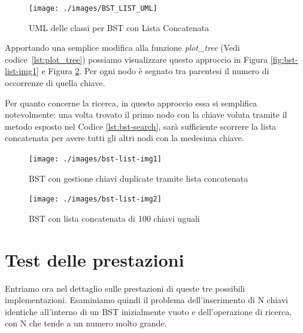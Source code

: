 \documentclass{article}
\begin{document}
\vspace{15px}


\begin{figure}[H]
  \centering
  \texttt{[image: ./images/BST\_LIST\_UML]}
    \caption{UML delle classi per BST con Lista Concatenata}
  \label{fig:BST_LIST_UML}
\end{figure}

\vspace{15px}

Apportando una semplice modifica alla funzione \textit{plot\_tree} (Vedi codice~\ref{lst:plot_tree}) possiamo visualizzare questo approccio in Figura \ref{fig:bst-list-img1} e Figura \ref{fig:bst-list-img2}.
Per ogni nodo è segnato tra parentesi il numero di occorrenze di quella chiave.

Per quanto concerne la ricerca, in questo approccio essa si semplifica notevolmente:
una volta trovato il primo nodo con la chiave voluta tramite il metodo esposto nel Codice \ref{lst:bst-search}, sarà sufficiente scorrere la lista concatenata per avere tutti gli altri nodi con la medesima chiave.


\begin{figure}[htbp]
    \centering
  \begin{minipage}{0.48\textwidth}  %
    \centering
    \texttt{[image: ./images/bst-list-img1]}
    \caption{BST con gestione chiavi duplicate tramite lista concatenata}
    \label{fig:bst-list-img1}
  \end{minipage}%
  \hfill  %
  \begin{minipage}{0.48\textwidth}  %
    \centering
    \texttt{[image: ./images/bst-list-img2]}
    \caption{BST con lista concatenata di 100 chiavi uguali}
    \label{fig:bst-list-img2}
  \end{minipage}
\end{figure}




\section{Test delle prestazioni}
Entriamo ora nel dettaglio sulle prestazioni di queste tre possibili implementazioni.
Esaminiamo quindi il problema dell'inserimento di N chiavi identiche all'interno di un BST inizialmente vuoto e dell'operazione di ricerca, con N che tende a un numero molto grande.
\end{document}

